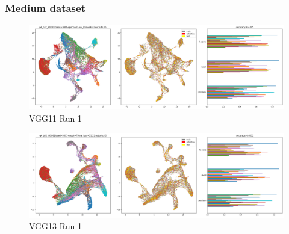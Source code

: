 \documentclass{article}
\begin{document}
\subsubsection*{Medium dataset}
\begin{figure}[h!]
  \includegraphics[width=\linewidth]{new_journal/figures/experiments/vgg/medium/vgg11/seed=3001-epoch=81-val_loss=26.22.outputs.png}
  \caption{VGG11 Run 1}
\end{figure}

\begin{figure}[h!]
  \includegraphics[width=\linewidth]{new_journal/figures/experiments/vgg/medium/vgg13/seed=3001-epoch=75-val_loss=31.21.outputs.png}
  \caption{VGG13 Run 1}
\end{figure}
\end{document}
